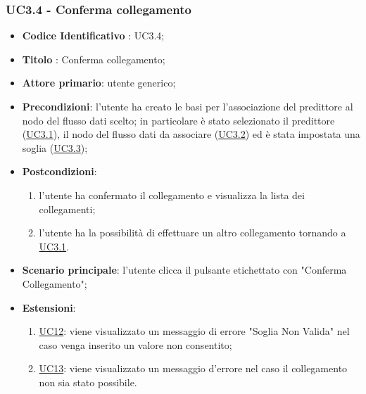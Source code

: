 	\subsubsection{UC3.4 - Conferma collegamento}
		\begin{itemize}
			\item\textbf{Codice Identificativo} : UC3.4;
			\item\textbf{Titolo} : Conferma collegamento;
			\item\textbf{Attore primario}: utente generico;
			\item\textbf{Precondizioni}: l'utente ha creato le basi per l'associazione del predittore al nodo del flusso dati scelto; in particolare è stato selezionato il predittore (\hyperref[par:UC3.1]{UC3.1}), il nodo del flusso dati da associare (\hyperref[par:UC3.2]{UC3.2}) ed è stata impostata una soglia (\hyperref[par:UC3.3]{UC3.3});
			\item\textbf{Postcondizioni}:
				\begin{enumerate}
					\item l'utente ha confermato il collegamento e visualizza la lista dei collegamenti;
					\item l'utente ha la possibilità di effettuare un altro collegamento tornando a \hyperref[par:UC3.1]{UC3.1}.
				\end{enumerate}
			\item\textbf{Scenario principale}: l'utente clicca il pulsante etichettato con "Conferma Collegamento";
			\item\textbf{Estensioni}: 
				\begin{enumerate}
					\item\hyperref[par:UC12]{UC12}: viene visualizzato un messaggio di errore "Soglia Non Valida" nel caso venga inserito un valore non consentito;			
					\item\hyperref[par:UC13]{UC13}: viene visualizzato un messaggio d'errore nel caso il collegamento non sia stato possibile.
				\end{enumerate}							
				
				
				
		\end{itemize}
		
	\label{par:UC3.5}
